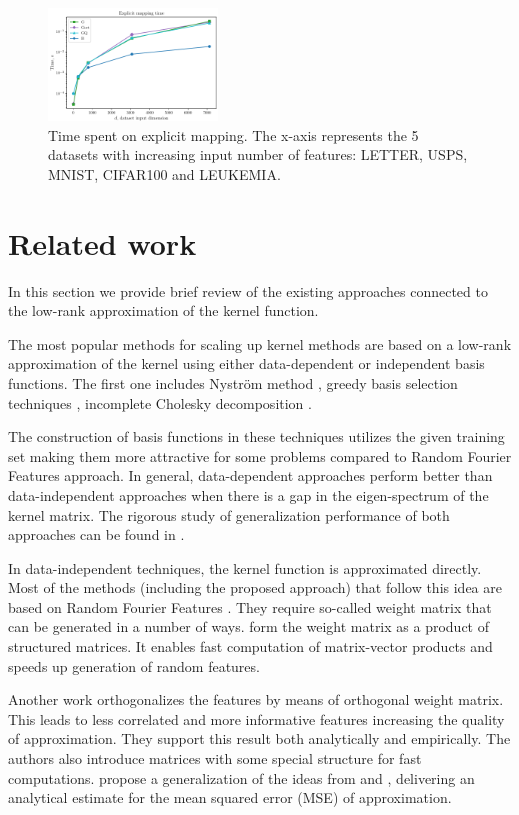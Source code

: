 \begin{figure}[h]
\centering
\includegraphics[width=0.4\textwidth]{figures/quadratures/time_r}
\caption{Time spent on explicit mapping. The x-axis represents the 5 datasets with increasing input number of features: LETTER, USPS, MNIST, CIFAR100 and LEUKEMIA.}
\label{fig:walltime}
\end{figure}

\section{Related work}
\label{sec:related_work}
In this section we provide brief review of the existing approaches
connected to the low-rank approximation of the kernel function.

The most popular methods for scaling up kernel methods are based on a low-rank approximation of the kernel using either data-dependent or independent basis functions.
The first one includes Nystr{\" o}m method \citep{drineas2005nystrom}, greedy basis selection techniques \citep{smola2000sparse}, incomplete Cholesky decomposition \citep{fine2001efficient}.

The construction of basis functions in these techniques utilizes the given training set making them more attractive for some problems compared to Random Fourier Features approach.
In general, data-dependent approaches perform better than data-independent approaches when there is a gap in the eigen-spectrum of the kernel matrix.
The rigorous study of generalization performance of both approaches can be found in \citep{yang2012nystrom}.

In data-independent techniques, the kernel function is approximated directly.
Most of the methods (including the proposed approach) that follow this idea are based on Random Fourier Features \citep{rahimi2008random}. They require so-called weight matrix that can be generated in a number of ways.
\citep{le2013fastfood} form the weight matrix as a product of
structured matrices.
It enables fast computation of matrix-vector products and speeds up generation of random features.

Another work \citep{felix2016orthogonal} orthogonalizes the features by means of orthogonal weight matrix.
This leads to less correlated and more informative features increasing the quality of approximation. They support this result both analytically and empirically.
The authors also introduce matrices with some special structure for fast computations.
\citep{choromanski2017unreasonable} propose a generalization of the ideas from \citep{le2013fastfood} and \citep{felix2016orthogonal}, delivering an analytical estimate for the mean squared error (MSE) of approximation.


